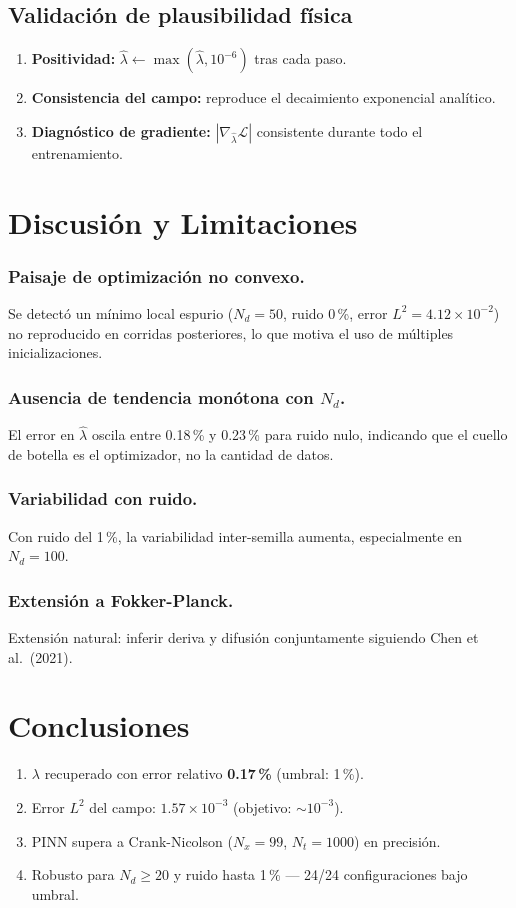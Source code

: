 \documentclass[12pt,a4paper]{article}
\newcommand{\lhat}{\hat{\lambda}}
\begin{document}
\subsection{Validación de plausibilidad física}
\begin{enumerate}
  \item \textbf{Positividad:} $\lhat\leftarrow\max(\lhat,10^{-6})$ tras cada paso.
  \item \textbf{Consistencia del campo:} reproduce el decaimiento exponencial analítico.
  \item \textbf{Diagnóstico de gradiente:} $|\nabla_{\lhat}\mathcal{L}|$ consistente durante todo el entrenamiento.
\end{enumerate}

\section{Discusión y Limitaciones}

\subsubsection*{Paisaje de optimización no convexo.}
Se detectó un mínimo local espurio ($N_d=50$, ruido 0\,\%, error $L^2=4.12\times10^{-2}$)
no reproducido en corridas posteriores, lo que motiva el uso de múltiples inicializaciones.

\subsubsection*{Ausencia de tendencia monótona con $N_d$.}
El error en $\lhat$ oscila entre 0.18\,\% y 0.23\,\% para ruido nulo, indicando que el
cuello de botella es el optimizador, no la cantidad de datos.

\subsubsection*{Variabilidad con ruido.}
Con ruido del 1\,\%, la variabilidad inter-semilla aumenta, especialmente en $N_d=100$.

\subsubsection*{Extensión a Fokker-Planck.}
Extensión natural: inferir deriva y difusión conjuntamente siguiendo Chen et al.\ (2021).

\section{Conclusiones}
\begin{enumerate}
  \item $\lambda$ recuperado con error relativo \textbf{0.17\,\%} (umbral: 1\,\%).
  \item Error $L^2$ del campo: $1.57\times10^{-3}$ (objetivo: $\sim10^{-3}$).
  \item PINN supera a Crank-Nicolson ($N_x=99$, $N_t=1000$) en precisión.
  \item Robusto para $N_d\geq20$ y ruido hasta 1\,\% — 24/24 configuraciones bajo umbral.
\end{enumerate}
\end{document}
